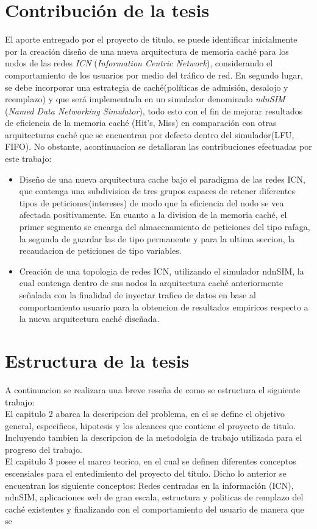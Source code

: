 \section{Contribución de la tesis}
El aporte entregado por el proyecto de titulo, se puede identificar inicialmente por la creación diseño de una nueva arquitectura de memoria caché para los nodos de las redes \textit{ICN} (\textit{Information Centric Network}), considerando el comportamiento de los usuarios por medio del tráfico de red. En segundo lugar, se debe incorporar una estrategia de caché(políticas de admisión, desalojo y reemplazo) y que será implementada en un simulador denominado \textit{ndnSIM} (\textit{Named Data Networking Simulator}), todo esto con el fin de mejorar resultados de eficiencia de la memoria caché (Hit's, Miss) en comparación con otras arquitecturas caché que se encuentran por defecto dentro del simulador(LFU, FIFO). No obstante, acontinuacion se detallaran las contribuciones efectuadas por este trabajo:\\
\begin{itemize}
	\item Diseño de una nueva arquitectura cache bajo el paradigma de las redes ICN, que contenga una subdivision de tres grupos capaces de retener diferentes tipos de peticiones(intereses) de modo que la eficiencia del nodo se vea afectada positivamente. En cuanto a la division de la memoria caché, el primer segmento se encarga del almacenamiento de peticiones del tipo rafaga, la segunda de guardar las de tipo permanente y para la ultima seccion, la recaudacion de peticiones de tipo variables.\\
	\item Creación de una topologia de redes ICN, utilizando el simulador ndnSIM, la cual contenga dentro de sus nodos la arquitectura caché anteriormente señalada con la finalidad de inyectar trafico de datos en base al comportamiento usuario para la obtencion de resultados empiricos respecto a la nueva arquitectura caché diseñada.\\
\end{itemize}


\section{Estructura de la tesis}
A continuacion se realizara una breve reseña de como se estructura el siguiente trabajo:\\

El capitulo 2 abarca la descripcion del problema, en el se define el objetivo general, especificos, hipotesis y los alcances que contiene el proyecto de titulo. Incluyendo tambien la descripcion de la metodolgia de trabajo utilizada para el progreso del trabajo.\\

El capitulo 3 posee el marco teorico, en el cual se definen diferentes conceptos escensiales para el entedimiento del proyecto del titulo. Dicho lo anterior se encuentran los siguiente conceptos: Redes centradas en la información (ICN), ndnSIM, aplicaciones web de gran escala, estructura y politicas de remplazo del caché existentes y finalizando con el comportamiento del usuario de manera que se 

